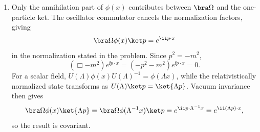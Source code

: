 \begin{enumerate}
\begin{enumerate}
\[
 \frac{\dd F}{\dd s}
 =\ii e^{is a\cdot P}[a\cdot P,\phi(x)]e^{-is a\cdot P}
 =a^\mu\partial_\mu F.
\]
With \(F(0)=\phi(x)\), the solution is
\[
 e^{ia\cdot P}\phi(x)e^{-ia\cdot P}=\phi(x+a).
\]
Changing the sign in the definition of the translation operator changes
both displayed signs but not the physical statement.
\item
Only the annihilation part of \(\phi(x)\) contributes between
\(\bra\Omega\) and the one-particle ket.  The oscillator commutator cancels
the normalization factors, giving
\[
 \bra\Omega\phi(x)\ket p=e^{\ii p\cdot x}
\]
in the normalization stated in the problem.  Since \(p^2=-m^2\),
\[
 (\Box-m^2)e^{\ii p\cdot x}=(-p^2-m^2)e^{\ii p\cdot x}=0.
\]
For a scalar field,
\(U(\Lambda)\phi(x)U(\Lambda)^{-1}=\phi(\Lambda x)\), while the
relativistically normalized state transforms as
\(U(\Lambda)\ket p=\ket{\Lambda p}\).  Vacuum invariance then gives
\[
 \bra\Omega\phi(x)\ket{\Lambda p}
 =\bra\Omega\phi(\Lambda^{-1}x)\ket p
 =e^{\ii p\cdot\Lambda^{-1}x}
 =e^{\ii(\Lambda p)\cdot x},
\]
so the result is covariant.
\end{enumerate}


\end{enumerate}
